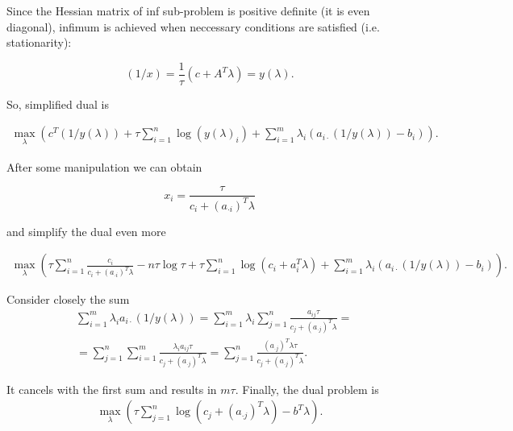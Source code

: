 \documentclass[a4paper,12pt,russian]{extreport}
\begin{document}
Since the Hessian matrix of inf sub-problem is positive definite (it is even diagonal), infimum is achieved when neccessary conditions are satisfied (i.e. stationarity):

$$
(1/x)=\frac{1}{\tau}(c+A^T\lambda)=y(\lambda).
$$

So, simplified dual is

\begin{align*}
\max_{\lambda}  \left( c^T(1/y(\lambda)) +\tau\sum_{i=1}^n \log(y(\lambda)_i) +\sum_{i=1}^m \lambda_i(a_{i\cdot}(1/y(\lambda))-b_i) \right).
\end{align*}

After some manipulation we can obtain 

$$
x_i=\frac{\tau}{c_i+(a_{\cdot i})^T\lambda}
$$

and simplify the dual even more

\begin{align*}
\max_{\lambda}  \left( \tau\sum_{i=1}^n\frac{c_i}{c_i+(a_{\cdot i})^T\lambda} - n\tau\log\tau+\tau\sum_{i=1}^n \log(c_i+a_i^T\lambda) +\sum_{i=1}^m \lambda_i(a_{i\cdot}(1/y(\lambda))-b_i) \right).
\end{align*}

Consider closely the sum
\begin{align*}
&\sum_{i=1}^m \lambda_ia_{i\cdot}(1/y(\lambda))=\sum_{i=1}^m \lambda_i \sum_{j=1}^n \frac{a_{ij}\tau}{c_j+(a_{\cdot j})^T\lambda}=\\
&= \sum_{j=1}^n \sum_{i=1}^m \frac{\lambda_ia_{ij}\tau}{c_j+(a_{\cdot j})^T\lambda}=\sum_{j=1}^n \frac{(a_{\cdot j})^T\lambda \tau}{c_j+(a_{\cdot j})^T\lambda}.
\end{align*}

It cancels with the first sum and results in $m\tau$. Finally, the dual problem is
\begin{align*}
\max_{\lambda}  \left( \tau\sum_{j=1}^n \log(c_j+(a_{\cdot j})^T\lambda) - b^T\lambda \right).
\end{align*}
\end{document}
